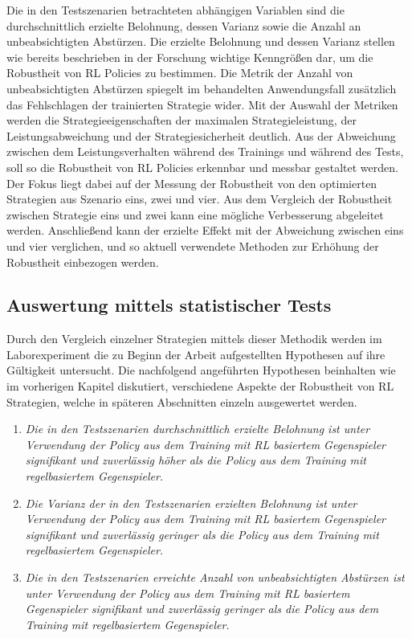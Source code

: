 Die in den Testszenarien betrachteten abhängigen Variablen sind die durchschnittlich erzielte Belohnung, dessen Varianz sowie die Anzahl an unbeabsichtigten Abstürzen.
Die erzielte Belohnung und dessen Varianz stellen wie bereits beschrieben in der Forschung wichtige Kenngrößen dar, um die Robustheit von RL Policies zu bestimmen.
Die Metrik der Anzahl von unbeabsichtigten Abstürzen spiegelt im behandelten Anwendungsfall zusätzlich das Fehlschlagen der trainierten Strategie wider.
Mit der Auswahl der Metriken werden die Strategieeigenschaften der maximalen Strategieleistung, der Leistungsabweichung und der Strategiesicherheit deutlich.
Aus der Abweichung zwischen dem Leistungsverhalten während des Trainings und während des Tests, soll so die Robustheit von RL Policies erkennbar und messbar gestaltet werden.
Der Fokus liegt dabei auf der Messung der Robustheit von den optimierten Strategien aus Szenario eins, zwei und vier.
Aus dem Vergleich der Robustheit zwischen Strategie eins und zwei kann eine mögliche Verbesserung abgeleitet werden.
Anschließend kann der erzielte Effekt mit der Abweichung zwischen eins und vier verglichen, und so aktuell verwendete Methoden zur Erhöhung der Robustheit einbezogen werden.

\subsection{Auswertung mittels statistischer Tests}

Durch den Vergleich einzelner Strategien mittels dieser Methodik werden im Laborexperiment die zu Beginn der Arbeit aufgestellten Hypothesen auf ihre Gültigkeit untersucht.
Die nachfolgend angeführten Hypothesen beinhalten wie im vorherigen Kapitel diskutiert, verschiedene Aspekte der Robustheit von RL Strategien, welche in späteren Abschnitten einzeln ausgewertet werden.
\begin{enumerate}
    \item \textit{Die in den Testszenarien durchschnittlich erzielte Belohnung ist unter Verwendung der Policy aus dem Training mit RL basiertem Gegenspieler signifikant und zuverlässig höher als die Policy aus dem Training mit regelbasiertem Gegenspieler.}
    \item \textit{Die Varianz der in den Testszenarien erzielten Belohnung ist unter Verwendung der Policy aus dem Training mit RL basiertem Gegenspieler signifikant und zuverlässig geringer als die Policy aus dem Training mit regelbasiertem Gegenspieler.}
    \item \textit{Die in den Testszenarien erreichte Anzahl von unbeabsichtigten Abstürzen ist unter Verwendung der Policy aus dem Training mit RL basiertem Gegenspieler signifikant und zuverlässig geringer als die Policy aus dem Training mit regelbasiertem Gegenspieler.}
\end{enumerate}

